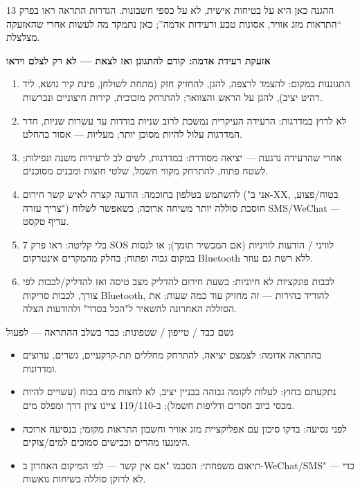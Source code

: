 


ההגנה כאן היא על בטיחות אישית, לא על כספי חשבונות. הגדרות התראה ראו בפרק 13 “התראות מזג אוויר, אסונות טבע ורעידות אדמה”; כאן נתמקד מה לעשות אחרי שהאזעקה מצלצלת.

\textbf{אזעקת רעידת אדמה: קודם להתגונן ואז לצאת — לא רק לצלם וידאו}\par

\begin{enumerate}
  \item התגוננות במקום: להצמד לרצפה, להגן, להחזיק חזק (מתחת לשולחן, פינת קיר נושא, ליד רהיט יציב), להגן על הראש והצוואר; להתרחק מזכוכית, קירות חיצוניים ונברשות.
  \item לא לרוץ במדרגות: הרעידה העיקרית נמשכת לרוב שניות בודדות עד עשרות שניות, חדר המדרגות עלול להיות מסוכן יותר; מעליות — אסור בהחלט.
  \item אחרי שהרעידה נרגעת — יציאה מסודרת: במדרגות, לשים לב לרעידות משנה ונפילות; לשטח פתוח, להתרחק מקווי חשמל, שלטי חוצות ומבנים מסוכנים.
  \item להשתמש בטלפון בחוכמה: הודעה קצרה לאיש קשר חירום ("אני ב-XX, בטוח/פצוע, צריך עזרה") חוסכת סוללה יותר משיחה ארוכה; כשאפשר לשלוח SMS/WeChat — עדיף טקסט.
  \item בלי קליטה: ראו פרק 7 SOS לוויני / הודעות לוויניות (אם המכשיר תומך); או לנסות במקום גבוה ופתוח; בחלק מהמקרים אינטרקום Bluetooth ללא רשת גם עוזר.
  \item לכבות פונקציות לא חיוניות: בשעת חירום להדליק מצב טיסה ואז להדליק/לכבות לפי צורך, לכבות סריקות Bluetooth, להוריד בהירות — זה מחזיק עוד כמה שעות; את הסוללה האחרונה להשאיר ל"הכל בסדר" ולהודעות הצלה.
\end{enumerate}

\begin{tcbwarn}{גשם כבד / טייפון / שטפונות: כבר בשלב ההתראה — לפעול}
\begin{itemize}
  \item בהתראה אדומה: לצמצם יציאה, להתרחק מחללים תת-קרקעיים, גשרים, ערוצים ומדרונות.
  \item נתקעתם בחוץ: לעלות לקומה גבוהה בבניין יציב, לא לחצות מים בכוח (עשויים להיות מכסי ביוב חסרים ודליפות חשמל); ב-119/110 ציינו ציון דרך ומפלס מים.
  \item לפני נסיעה: בדקו סיכון עם אפליקציית מזג אוויר וחשבון התראות מקומי; בנסיעה ארוכה הימנעו מהרים וכבישים סמוכים למים/צוקים.
  \item תיאום משפחתי: הסכמו "אם אין קשר — לפי המיקום האחרון ב-WeChat/SMS" — כדי לא לרוקן סוללה בשיחות נואשות.
\end{itemize}

\end{tcbwarn}

